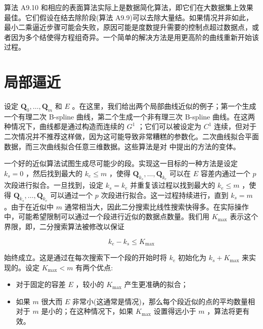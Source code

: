 \documentclass[../main.tex]{subfiles}
\begin{document}
算法 A9.10 和相应的表面算法实际上是数据简化算法，即它们在大数据集上效果最佳。它们假设在结去除阶段(算法 A9.9)可以去除大量结。如果情况并非如此，最小二乘逼近步骤可能会失败，原因可能是度数提升需要的控制点超过数据点，或者因为多个结使得方程组奇异。一个简单的解决方法是用更高阶的曲线重新开始该过程。



\section{局部逼近}

设定 \({\mathbf{Q}}_{0},\ldots ,{\mathbf{Q}}_{m}\) 和 \(E\) 。在这里，我们给出两个局部曲线近似的例子；第一个生成一个有理二次 B-spline 曲线，第二个生成一个非有理三次 B-spline 曲线。在这两种情况下，曲线都是通过构造而连续的 \({G}^{1}\) ；它们可以被设定为 \({C}^{1}\) 连续，但对于二次情况并不推荐这样做，因为这可能导致非常糟糕的参数化。二次曲线拟合平面数据，而三次曲线拟合任意三维数据。这些算法是对 \cite{Pieg87b,Chou92} 中提出的方法的变体。

一个好的近似算法试图生成尽可能少的段。实现这一目标的一种方法是设定 \({k}_{s} = 0\) ，然后找到最大的 \({k}_{e} \leq  m\) ，使得 \({\mathbf{Q}}_{{k}_{s}},\ldots ,{\mathbf{Q}}_{{k}_{e}}\) 可以在 \(E\) 容差内通过一个 \(p\) 次段进行拟合。一旦找到，设定 \({k}_{s} = {k}_{e}\) 并重复该过程以找到最大的 \({k}_{e} \leq  m\) ，使得 \({\mathbf{Q}}_{{k}_{s}},\ldots ,{\mathbf{Q}}_{{k}_{e}}\) 可以通过一个 \(p\) 次段进行拟合。这一过程持续进行，直到 \({k}_{s} = m\) 。由于在近似中 \(m\) 通常相当大，因此二分搜索比线性搜索快得多。在实际操作中，可能希望限制可以通过一个段进行近似的数据点数量。我们用 \({K}_{\max }\) 表示这个界限，即，二分搜索算法被修改以保证

\[
{k}_{e} - {k}_{s} \leq  {K}_{\max }
\]

始终成立。这是通过在每次搜索下一个段的开始时将 \({k}_{e}\) 初始化为 \({k}_{s} + {K}_{\max }\) 来实现的。设定 \({K}_{\max } < m\) 有两个优点:

\begin{itemize}
\item 对于固定的容差 \(E\) ，较小的 \({K}_{\max }\) 产生更准确的拟合；
\end{itemize}

\begin{itemize}
\item 如果 \(m\) 很大而 \(E\) 非常小(这通常是情况)，那么每个段近似的点的平均数量相对于 \(m\) 是小的；在这种情况下，如果 \({K}_{\max }\) 设置得远小于 \(m\) ，算法将更有效。
\end{itemize}
\end{document}
